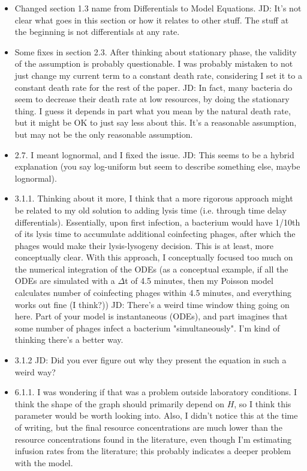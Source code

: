 \documentclass{article}
\begin{document}
\begin{itemize}
    \item Changed section 1.3 name from Differentials to Model Equations.
        \subitem JD: It's not clear what goes in this section or how it relates to other stuff. The stuff at the beginning is not differentials at any rate.
    \item Some fixes in section 2.3. After thinking about stationary phase, the validity of the assumption is probably questionable. I was probably mistaken to not just change my current term to a constant death rate, considering I set it to a constant death rate for the rest of the paper. 
        \subitem JD: In fact, many bacteria do seem to decrease their death rate at low resources, by doing the stationary thing. I guess it depends in part what you mean by the natural death rate, but it might be OK to just say less about this. It's a reasonable assumption, but may not be the only reasonable assumption.
    \item  2.7. I meant lognormal, and I fixed the issue.
        \subitem JD: This seems to be a hybrid explanation (you say log-uniform but seem to describe something else, maybe lognormal).
    \item 3.1.1. Thinking about it more, I think that a more rigorous approach might be related to my old solution to adding lysis time (i.e. through time delay differentials). Essentially, upon first infection, a bacterium would have 1/10th of its lysis time to accumulate additional coinfecting phages, after which the phages would make their lysis-lysogeny decision. This is at least, more conceptually clear. With this approach, I conceptually focused too much on the numerical integration of the ODEs (as a conceptual example, if all the ODEs are simulated with a $\Delta$t of 4.5 minutes, then my Poisson model calculates number of coinfecting phages within 4.5 minutes, and everything works out fine (I think?))
        \subitem JD: There's a weird time window thing going on here. Part of your model is instantaneous (ODEs), and part imagines that some number of phages infect a bacterium "simultaneously". I'm kind of thinking there's a better way.
    \item 3.1.2
        \subitem JD: Did you ever figure out why they present the equation in such a weird way?
    \item 6.1.1. I was wondering if that was a problem outside laboratory conditions. I think the shape of the graph should primarily depend on $H$, so I think this parameter would be worth looking into. Also, I didn't notice this at the time of writing, but the final resource concentrations are much lower than the resource concentrations found in the literature, even though I'm estimating infusion rates from the literature; this probably indicates a deeper problem with the model.

\end{itemize}
\end{document}

